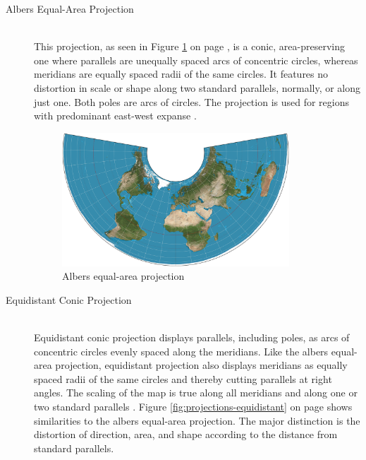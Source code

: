 \begin{description}
\item[Albers Equal-Area Projection] \hfill \\
\label{s:albers-equal-area-projection}
This projection, as seen in Figure \ref{fig:projections-albers-ea} on page \pageref{fig:projections-albers-ea}, is a conic, area-preserving one where parallels are unequally spaced arcs of concentric circles, whereas meridians are equally spaced radii of the same circles. It features no distortion in scale or shape along two standard parallels, normally, or along just one. Both poles are arcs of circles. The projection is used for regions with predominant east-west expanse .

\begin{figure}[!htb]
\centering
\includegraphics[height=5cm,keepaspectratio]{images/methods/projections/albers.jpg}
\caption[
    Albers equal-area projection, Urldate: 07.2016 \newline
    \small\texttt{\url{https://upload.wikimedia.org/wikipedia/commons/1/1f/Albers_projection_SW.jpg}}.
]{Albers equal-area projection}
\label{fig:projections-albers-ea}
\end{figure}

\item[Equidistant Conic Projection] \hfill \\
Equidistant conic projection displays parallels, including poles, as arcs of concentric circles evenly spaced along the meridians. Like the albers equal-area projection, equidistant projection also displays meridians as equally spaced radii of the same circles and thereby cutting parallels at right angles. The scaling of the map is true along all meridians and along one or two standard parallels . Figure \ref{fig:projections-equidistant} on page \pageref{fig:projections-equidistant} shows similarities to the albers equal-area projection. The major distinction is the distortion of direction, area, and shape according to the distance from standard parallels.


\end{description}
